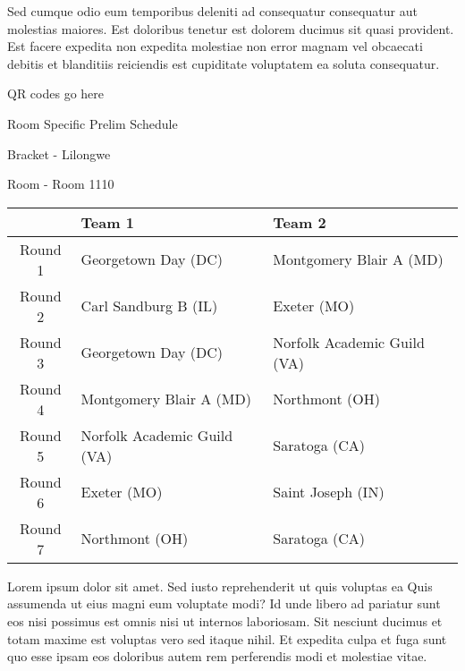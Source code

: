 \documentclass{article}%
\begin{document}
\newline%
Sed cumque odio eum temporibus deleniti ad consequatur consequatur aut molestias maiores. Est doloribus tenetur est dolorem ducimus sit quasi provident. Est facere expedita non expedita molestiae non error magnam vel obcaecati debitis et blanditiis reiciendis est cupiditate voluptatem ea soluta consequatur.%
\vspace*{140pt}%
\begin{center}%
\begin{Huge}%
QR codes go here%
\end{Huge}%
\end{center}%
\newpage%
\begin{center}%
\begin{Huge}%
Room Specific Prelim Schedule%
\end{Huge}%
\vspace*{8pt}%
\linebreak%
\begin{Large}%
Bracket {-} Lilongwe%
\end{Large}%
\vspace*{8pt}%
\linebreak%
\vspace*{8pt}%
\begin{Large}%
Room {-} Room 1110%
\end{Large}%
\end{center}%
%
\begin{tabularx}{\textwidth}{|c|Y|Y|}%
\hline%
&Team 1&Team 2\\%
\hline%
Round 1&Georgetown Day (DC)&Montgomery Blair A (MD)\\%
Round 2&Carl Sandburg B (IL)&Exeter (MO)\\%
Round 3&Georgetown Day (DC)&Norfolk Academic Guild (VA)\\%
Round 4&Montgomery Blair A (MD)&Northmont (OH)\\%
Round 5&Norfolk Academic Guild (VA)&Saratoga (CA)\\%
Round 6&Exeter (MO)&Saint Joseph (IN)\\%
Round 7&Northmont (OH)&Saratoga (CA)\\%
\hline%
\end{tabularx}%
\vspace*{8pt}%
\newline%
Lorem ipsum dolor sit amet. Sed iusto reprehenderit ut quis voluptas ea Quis assumenda ut eius magni eum voluptate modi? Id unde libero ad pariatur sunt eos nisi possimus est omnis nisi ut internos laboriosam. Sit nesciunt ducimus et totam maxime est voluptas vero sed itaque nihil. Et expedita culpa et fuga sunt quo esse ipsam eos doloribus autem rem perferendis modi et molestiae vitae.\newline%
\end{document}
